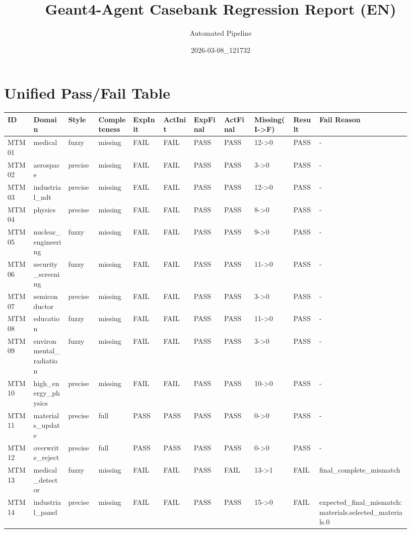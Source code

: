 \documentclass[11pt]{ctexart}
\title{Geant4-Agent Casebank Regression Report (EN)}
\author{Automated Pipeline}
\date{2026-03-08\_121732}
\begin{document}
\maketitle
\section{Unified Pass/Fail Table}
\begin{longtable}{p{0.06\linewidth}p{0.08\linewidth}p{0.07\linewidth}p{0.08\linewidth}p{0.07\linewidth}p{0.07\linewidth}p{0.07\linewidth}p{0.07\linewidth}p{0.09\linewidth}p{0.06\linewidth}p{0.21\linewidth}}
\toprule
ID & Domain & Style & Completeness & ExpInit & ActInit & ExpFinal & ActFinal & Missing(I->F) & Result & Fail Reason \\
\midrule
MTM01 & medical & fuzzy & missing & FAIL & FAIL & PASS & PASS & 12->0 & PASS & - \\
MTM02 & aerospace & precise & missing & FAIL & FAIL & PASS & PASS & 3->0 & PASS & - \\
MTM03 & industrial\_ndt & precise & missing & FAIL & FAIL & PASS & PASS & 12->0 & PASS & - \\
MTM04 & physics & precise & missing & FAIL & FAIL & PASS & PASS & 8->0 & PASS & - \\
MTM05 & nuclear\_engineering & fuzzy & missing & FAIL & FAIL & PASS & PASS & 9->0 & PASS & - \\
MTM06 & security\_screening & fuzzy & missing & FAIL & FAIL & PASS & PASS & 11->0 & PASS & - \\
MTM07 & semiconductor & precise & missing & FAIL & FAIL & PASS & PASS & 3->0 & PASS & - \\
MTM08 & education & fuzzy & missing & FAIL & FAIL & PASS & PASS & 11->0 & PASS & - \\
MTM09 & environmental\_radiation & fuzzy & missing & FAIL & FAIL & PASS & PASS & 3->0 & PASS & - \\
MTM10 & high\_energy\_physics & precise & missing & FAIL & FAIL & PASS & PASS & 10->0 & PASS & - \\
MTM11 & materials\_update & precise & full & PASS & PASS & PASS & PASS & 0->0 & PASS & - \\
MTM12 & overwrite\_reject & precise & full & PASS & PASS & PASS & PASS & 0->0 & PASS & - \\
MTM13 & medical\_detector & fuzzy & missing & FAIL & FAIL & PASS & FAIL & 13->1 & FAIL & final\_complete\_mismatch \\
MTM14 & industrial\_panel & precise & missing & FAIL & FAIL & PASS & PASS & 15->0 & FAIL & expected\_final\_mismatch:materials.selected\_materials.0 \\

\end{longtable}
\end{document}
